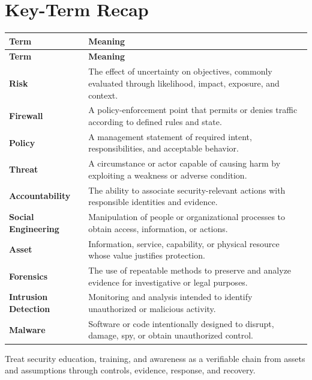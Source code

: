 \documentclass[11pt]{article}
\begin{document}
\section*{Key-Term Recap}
\begin{longtable}{>{\RaggedRight\arraybackslash}p{}>{\RaggedRight\arraybackslash}p{}}
\toprule\rowcolor{Navy}\color{white}\textbf{Term} & \color{white}\textbf{Meaning}\\\midrule
\endfirsthead
\toprule\rowcolor{Navy}\color{white}\textbf{Term} & \color{white}\textbf{Meaning}\\\midrule
\endhead
\textbf{Risk} & The effect of uncertainty on objectives, commonly evaluated through likelihood, impact, exposure, and context. \\\midrule
\textbf{Firewall} & A policy-enforcement point that permits or denies traffic according to defined rules and state. \\\midrule
\textbf{Policy} & A management statement of required intent, responsibilities, and acceptable behavior. \\\midrule
\textbf{Threat} & A circumstance or actor capable of causing harm by exploiting a weakness or adverse condition. \\\midrule
\textbf{Accountability} & The ability to associate security-relevant actions with responsible identities and evidence. \\\midrule
\textbf{Social Engineering} & Manipulation of people or organizational processes to obtain access, information, or actions. \\\midrule
\textbf{Asset} & Information, service, capability, or physical resource whose value justifies protection. \\\midrule
\textbf{Forensics} & The use of repeatable methods to preserve and analyze evidence for investigative or legal purposes. \\\midrule
\textbf{Intrusion Detection} & Monitoring and analysis intended to identify unauthorized or malicious activity. \\\midrule
\textbf{Malware} & Software or code intentionally designed to disrupt, damage, spy, or obtain unauthorized control. \\\midrule
\bottomrule
\end{longtable}
\begin{takeawaybox}
Treat security education, training, and awareness as a verifiable chain from assets and assumptions through controls, evidence, response, and recovery.
\end{takeawaybox}
\end{document}
